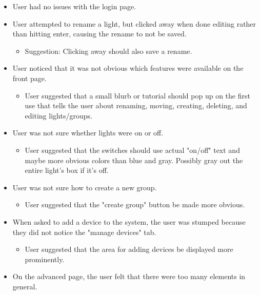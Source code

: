 \documentclass[10pt,draftclsnofoot,onecolumn]{IEEEtran}
\begin{document}
\begin{itemize}
    \item User had no issues with the login page.
    \item User attempted to rename a light, but clicked away when done editing
        rather than hitting enter, causing the rename to not be saved.
        \begin{itemize}
            \item Suggestion: Clicking away should also save a rename.
        \end{itemize}
    \item User noticed that it was not obvious which features were available on
        the front page.
        \begin{itemize}
            \item User suggested that a small blurb or tutorial should pop up
                on the first use that tells the user about renaming, moving,
                creating, deleting, and editing lights/groups.
        \end{itemize}
    \item User was not sure whether lights were on or off.
        \begin{itemize}
            \item User suggested that the switches should use actual "on/off"
                text and maybe more obvious colors than blue and gray.
                Possibly gray out the entire light's box if it's off.
        \end{itemize}
    \item User was not sure how to create a new group.
        \begin{itemize}
            \item User suggested that the "create group" button be made more
                obvious.
        \end{itemize}
    \item When asked to add a device to the system, the user was stumped
        because they did not notice the "manage devices" tab.
        \begin{itemize}
            \item User suggested that the area for adding devices be displayed
                more prominently.
        \end{itemize}
    \item On the advanced page, the user felt that there were too many elements
        in general.
        \begin{itemize}

\end{itemize}
\end{itemize}
\end{document}
